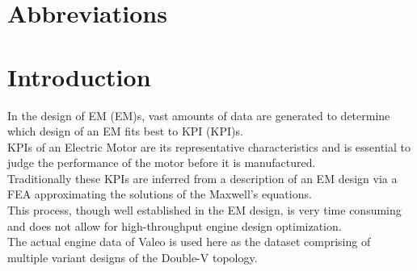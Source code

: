 \documentclass{report} %
\begin{document}
\newpage

\newpage

\begin{spacing}{1.2}
    \tableofcontents
\end{spacing}

\newpage

\newpage

\chapter*{Abbreviations}
\begin{acronym}[TDMA]
  

\end{acronym}

\newpage

\newpage

\chapter{Introduction} 
In the design of \acl{EM} (\ac{EM})s, vast amounts of data are generated to determine which design of an \ac{EM} fits best to \acl{KPI} (\ac{KPI})s. \\
\ac{KPI}s of an Electric Motor are its representative characteristics and is essential to judge the performance of the motor before it is manufactured. \\
Traditionally these \ac{KPI}s are inferred from a description of an \ac{EM} design via a \ac{FEA} approximating the solutions of the Maxwell’s equations. \\
This process, though well established in the \ac{EM} design, is very time consuming and does not allow for high-throughput engine design optimization. \\
The actual engine data of Valeo is used here as the dataset comprising of multiple variant designs of the Double-V topology.\\
\end{document}
